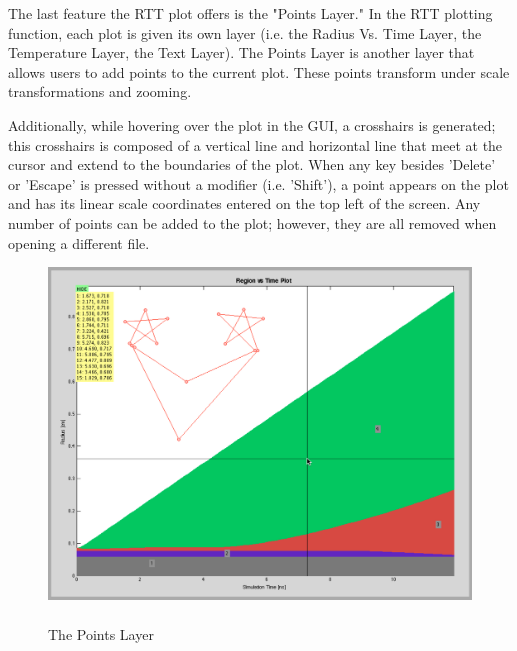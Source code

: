 The last feature the RTT plot offers is the "Points Layer."  In the RTT plotting function, each plot is given its own layer (i.e. the Radius Vs. Time Layer, the Temperature Layer, the Text Layer).  The Points Layer is another layer that allows users to add points to the current plot.  These points transform under scale transformations and zooming.  

Additionally, while hovering over the plot in the GUI, a crosshairs is generated; this crosshairs is composed of a vertical line and horizontal line that meet at the cursor and extend to the boundaries of the plot.  When any key besides 'Delete' or 'Escape' is pressed without a modifier (i.e. 'Shift'), a point appears on the plot and has its linear scale coordinates entered on the top left of the screen.  Any number of points can be added to the plot; however, they are all removed when opening a different file. 


\begin{figure}	
	\centering
	\includegraphics[scale=.24]{graphics/pointsLayer.png} 
	\caption[The Points Layer]{ \\ The Points Layer \\ }
	\label{fig:pointsLayer}
\end{figure}
